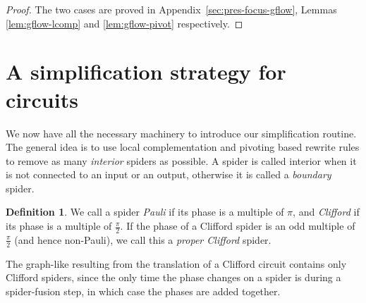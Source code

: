 \documentclass[a4paper,onecolumn,superscriptaddress,11pt,accepted=2020-04-27]{quantumarticle}
\newcommand{\symd}{\mathbin{\Delta}\xspace}
\theoremstyle{definition}
\newtheorem{definition}[theorem]{Definition}
\newtheorem{remark}[theorem]{Remark}
\begin{document}
\begin{proof}
The two cases are proved in Appendix~\ref{sec:pres-focus-gflow}, Lemmas \ref{lem:gflow-lcomp} and \ref{lem:gflow-pivot} respectively.
\end{proof}




\section{A simplification strategy for circuits}\label{sec:simp}
We now have all the necessary machinery to introduce our simplification routine. The general idea is to use local complementation and pivoting based rewrite rules to remove as many \emph{interior} spiders as possible. A spider is called interior when it is not connected to an input or an output, otherwise it is called a \textit{boundary} spider.

\begin{definition}
  We call a spider \emph{Pauli} if its phase is a multiple of $\pi$, and \emph{Clifford} if its phase is a multiple of $\frac\pi2$. If the phase of a Clifford spider is an odd multiple of $\frac\pi2$ (and hence non-Pauli), we call this a \emph{proper Clifford} spider.
\end{definition}

\noindent The graph-like \zxdiagram resulting from the translation of a Clifford circuit contains only Clifford spiders, since the only time the phase changes on a spider is during a spider-fusion step, in which case the phases are added together.
\end{document}
